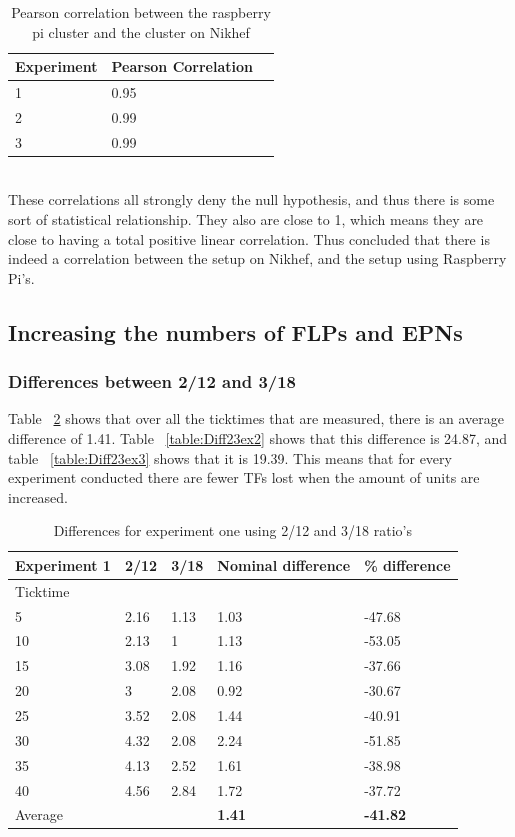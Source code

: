 \begin{table}[h!]
\begin{tabular}{| l | l | l |}
\hline
Experiment & Pearson Correlation \\ \hline
1 & 0.95 \\ \hline
2 & 0.99 \\ \hline
3 & 0.99 \\ \hline
\end{tabular}
\caption{Pearson correlation between the raspberry pi cluster and the cluster on Nikhef}
\label{table:PearsonCor}
\end{table}

~\\ These correlations all strongly deny the null hypothesis, and thus there is some sort of statistical relationship. They also are close to 1, which means they are close to having a total positive linear correlation. Thus concluded that there is indeed a correlation between the setup on Nikhef, and the setup using Raspberry Pi's.

\subsection{Increasing the numbers of FLPs and EPNs}

\subsubsection*{Differences between 2/12 and 3/18}
Table ~\ref{table:Diff23ex1} shows that over all the ticktimes that are measured, there is an average difference of 1.41. Table ~\ref{table:Diff23ex2} shows that this difference is 24.87, and table ~\ref{table:Diff23ex3} shows that it is 19.39. This means that for every experiment conducted there are fewer TFs lost when the amount of units are increased.

\begin{table}[!htbp]
\begin{tabular}{| l | l | l | l | l |}
\hline
Experiment 1 & 2/12 & 3/18 & Nominal difference & \% difference \\ \hline
Ticktime &&&& \\ \hline
5 & 2.16 & 1.13 & 1.03 & -47.68 \\ \hline
10 & 2.13 & 1 & 1.13 & -53.05 \\ \hline
15 & 3.08 & 1.92 & 1.16 & -37.66 \\ \hline
20 & 3 & 2.08 & 0.92 & -30.67 \\ \hline
25 & 3.52 & 2.08 & 1.44 & -40.91 \\ \hline
30 & 4.32 & 2.08 & 2.24 & -51.85 \\ \hline
35 & 4.13 & 2.52 & 1.61 & -38.98 \\ \hline
40 & 4.56 & 2.84 & 1.72 & -37.72 \\ \hline \hline
Average &&& \textbf{1.41} & \textbf{-41.82} \\ \hline
\end{tabular}
\caption{Differences for experiment one using 2/12 and 3/18 ratio's}
\label{table:Diff23ex1}
\end{table}

